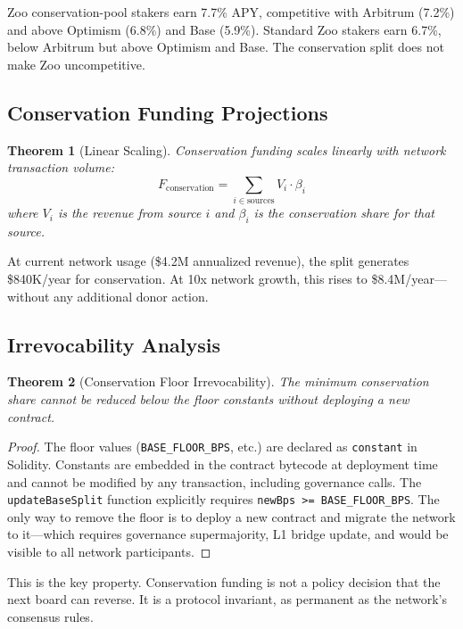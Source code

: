 \documentclass[11pt,letterpaper]{article}
\newtheorem{theorem}{Theorem}[section]
\begin{document}
Zoo conservation-pool stakers earn 7.7\% APY, competitive with Arbitrum (7.2\%) and above Optimism (6.8\%) and Base (5.9\%). Standard Zoo stakers earn 6.7\%, below Arbitrum but above Optimism and Base. The conservation split does not make Zoo uncompetitive.

\subsection{Conservation Funding Projections}

\begin{theorem}[Linear Scaling]
Conservation funding scales linearly with network transaction volume:
\begin{equation}
    F_{\text{conservation}} = \sum_{i \in \text{sources}} V_i \cdot \beta_i
\end{equation}
where $V_i$ is the revenue from source $i$ and $\beta_i$ is the conservation share for that source.
\end{theorem}

At current network usage (\$4.2M annualized revenue), the split generates \$840K/year for conservation. At 10x network growth, this rises to \$8.4M/year---without any additional donor action.

\subsection{Irrevocability Analysis}

\begin{theorem}[Conservation Floor Irrevocability]
The minimum conservation share cannot be reduced below the floor constants without deploying a new contract.
\end{theorem}

\begin{proof}
The floor values (\texttt{BASE\_FLOOR\_BPS}, etc.) are declared as \texttt{constant} in Solidity. Constants are embedded in the contract bytecode at deployment time and cannot be modified by any transaction, including governance calls. The \texttt{updateBaseSplit} function explicitly requires \texttt{newBps >= BASE\_FLOOR\_BPS}. The only way to remove the floor is to deploy a new contract and migrate the network to it---which requires governance supermajority, L1 bridge update, and would be visible to all network participants.
\end{proof}

This is the key property. Conservation funding is not a policy decision that the next board can reverse. It is a protocol invariant, as permanent as the network's consensus rules.
\end{document}
